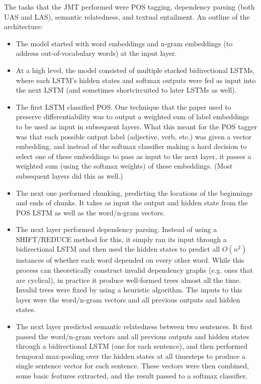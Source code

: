 The tasks that the JMT performed were POS tagging, dependency parsing (both UAS and LAS), semantic relatedness, and textual entailment. An outline of the architecture:
\begin{itemize}
\item The model started with word embeddings and n-gram embeddings (to address out-of-vocabulary words) at the input layer.
\item At a high level, the model consisted of multiple stacked bidirectional LSTMs, where each LSTM's hidden states and softmax outputs were fed as input into the next LSTM (and sometimes shortcircuited to later LSTMs as well).
\item The first LSTM classified POS. One technique that the paper used to preserve differentiability was to output a weighted sum of label embeddings to be used as input in subsequent layers. What this meant for the POS tagger was that each possible output label (adjective, verb, etc.) was given a vector embedding, and instead of the softmax classifier making a hard decision to select one of these embeddings to pass as input to the next layer, it passes a weighted sum (using the softmax weights) of these embeddings. (Most subsequent layers did this as well.)
\item The next one performed chunking, predicting the locations of the beginnings and ends of chunks. It takes as input the output and hidden state from the POS LSTM as well as the word/n-gram vectors.
\item The next layer performed dependency parsing. Instead of using a SHIFT/REDUCE method for this, it simply ran its input through a bidirectional LSTM and then used the hidden states to predict all $O(n^2)$ instances of whether each word depended on every other word. While this process can theoretically construct invalid  dependency graphs (e.g. ones that are cyclical), in practice it produce well-formed trees almost all the time. Invalid trees were fixed by using a heuristic algorithm. The inputs to this layer were the word/n-gram vectors and all previous outputs and hidden states.
\item The next layer predicted semantic relatedness between two sentences. It first passed the word/n-gram vectors and all previous outputs and hidden states through a bidirectional LSTM (one for each sentence), and then performed temporal max-pooling over the hidden states at all timesteps to produce a single sentence vector for each sentence. These vectors were then combined, some basic features extracted, and the result passed to a softmax classifier.

\end{itemize}
